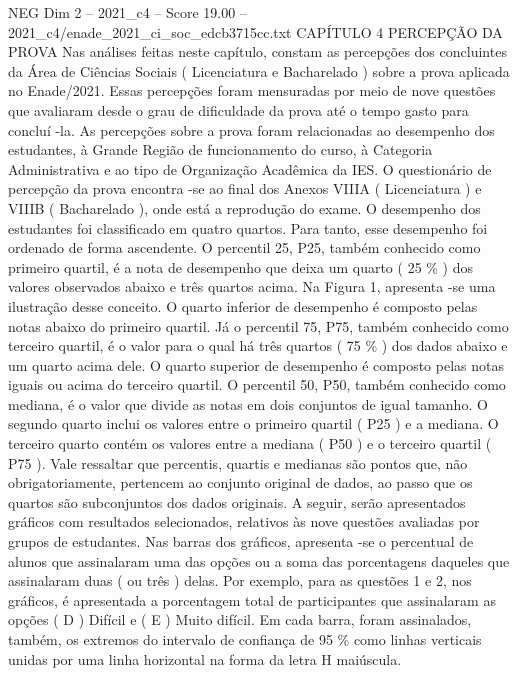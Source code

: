 \begin{textsample}{NEG Dim 2 – 2021\_c4 – Score 19.00 – 2021\_c4/enade\_2021\_ci\_soc\_edcb3715cc.txt}  \label{ex:f2_neg_402}
CAPÍTULO 4 PERCEPÇÃO DA PROVA Nas análises feitas neste capítulo, constam as percepções dos concluintes da Área de Ciências Sociais ( Licenciatura e Bacharelado ) sobre a prova aplicada no Enade/2021.
Essas percepções foram mensuradas por meio de nove questões que avaliaram desde o grau de dificuldade da prova até o tempo gasto para concluí -la.
As percepções sobre a prova foram relacionadas ao desempenho dos estudantes, à Grande Região de funcionamento do curso, à Categoria Administrativa e ao tipo de Organização Acadêmica da IES.
O questionário de percepção da prova encontra -se ao final dos Anexos VIIIA ( Licenciatura ) e VIIIB ( Bacharelado ), onde está a reprodução do exame.
O desempenho dos estudantes foi classificado em quatro quartos.
Para tanto, esse desempenho foi ordenado de forma ascendente.
O percentil 25, P25, também conhecido como primeiro quartil, é a nota de desempenho que deixa um quarto ( 25 \% ) dos valores observados abaixo e três quartos acima.
Na Figura 1, apresenta -se uma ilustração desse conceito.
O quarto inferior de desempenho é composto pelas notas abaixo do primeiro quartil.
Já o percentil 75, P75, também conhecido como terceiro quartil, é o valor para o qual há três quartos ( 75 \% ) dos dados abaixo e um quarto acima dele.
O quarto superior de desempenho é composto pelas notas iguais ou acima do terceiro quartil.
O percentil 50, P50, também conhecido como mediana, é o valor que divide as notas em dois conjuntos de igual tamanho.
O segundo quarto inclui os valores entre o primeiro quartil ( P25 ) e a mediana.
O terceiro quarto contém os valores entre a mediana ( P50 ) e o terceiro quartil ( P75 ).
Vale ressaltar que percentis, quartis e medianas são pontos que, não obrigatoriamente, pertencem ao conjunto original de dados, ao passo que os quartos são subconjuntos dos dados originais.
A seguir, serão apresentados gráficos com resultados selecionados, relativos às nove questões avaliadas por grupos de estudantes.
Nas barras dos gráficos, apresenta -se o percentual de alunos que assinalaram uma das opções ou a soma das porcentagens daqueles que assinalaram duas ( ou três ) delas.
Por exemplo, para as questões 1 e 2, nos gráficos, é apresentada a porcentagem total de participantes que assinalaram as opções ( D ) Difícil e ( E ) Muito difícil.
Em cada barra, foram assinalados, também, os extremos do intervalo de confiança de 95 \% como linhas verticais unidas por uma linha horizontal na forma da letra H maiúscula.

\end{textsample}
